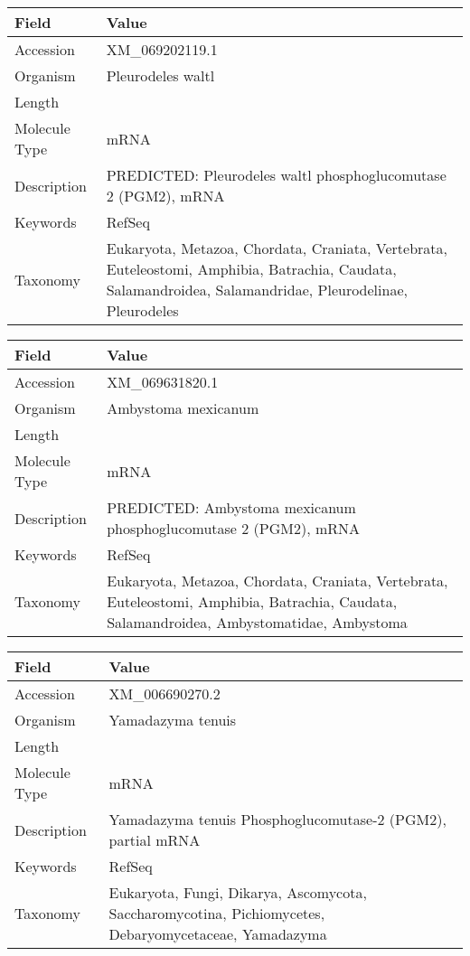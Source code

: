 \documentclass[10pt]{article}
\begin{document}
\vspace{1em}
{\footnotesize
\begin{longtable}{>{\raggedright\arraybackslash}p{4.5cm} >{\raggedright\arraybackslash}p{11.5cm}}
\textbf{Field} & \textbf{Value} \\
\hline
Accession & XM\_069202119.1 \\
Organism & Pleurodeles waltl \\
Length & 2344 \\
Molecule Type & mRNA \\
Description & PREDICTED: Pleurodeles waltl phosphoglucomutase 2 (PGM2), mRNA \\
Keywords & RefSeq \\
Taxonomy & Eukaryota, Metazoa, Chordata, Craniata, Vertebrata, Euteleostomi, Amphibia, Batrachia, Caudata, Salamandroidea, Salamandridae, Pleurodelinae, Pleurodeles \\
\end{longtable}
}

\vspace{1em}
{\footnotesize
\begin{longtable}{>{\raggedright\arraybackslash}p{4.5cm} >{\raggedright\arraybackslash}p{11.5cm}}
\textbf{Field} & \textbf{Value} \\
\hline
Accession & XM\_069631820.1 \\
Organism & Ambystoma mexicanum \\
Length & 3639 \\
Molecule Type & mRNA \\
Description & PREDICTED: Ambystoma mexicanum phosphoglucomutase 2 (PGM2), mRNA \\
Keywords & RefSeq \\
Taxonomy & Eukaryota, Metazoa, Chordata, Craniata, Vertebrata, Euteleostomi, Amphibia, Batrachia, Caudata, Salamandroidea, Ambystomatidae, Ambystoma \\
\end{longtable}
}

\vspace{1em}
{\footnotesize
\begin{longtable}{>{\raggedright\arraybackslash}p{4.5cm} >{\raggedright\arraybackslash}p{11.5cm}}
\textbf{Field} & \textbf{Value} \\
\hline
Accession & XM\_006690270.2 \\
Organism & Yamadazyma tenuis \\
Length & 2955 \\
Molecule Type & mRNA \\
Description & Yamadazyma tenuis Phosphoglucomutase-2 (PGM2), partial mRNA \\
Keywords & RefSeq \\
Taxonomy & Eukaryota, Fungi, Dikarya, Ascomycota, Saccharomycotina, Pichiomycetes, Debaryomycetaceae, Yamadazyma \\
\end{longtable}
}
\end{document}
